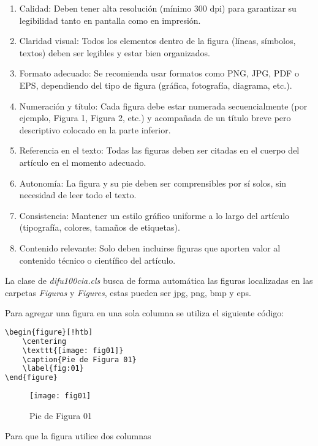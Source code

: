 \documentclass[12pt]{difu100cia} %
\begin{document}
\begin{enumerate}
    \item Calidad: Deben tener alta resolución (mínimo 300 dpi) para garantizar su legibilidad tanto en pantalla como en impresión.
    \item Claridad visual: Todos los elementos dentro de la figura (líneas, símbolos, textos) deben ser legibles y estar bien organizados.
    \item Formato adecuado: Se recomienda usar formatos como PNG, JPG, PDF o EPS, dependiendo del tipo de figura (gráfica, fotografía, diagrama, etc.).
    \item Numeración y título: Cada figura debe estar numerada secuencialmente (por ejemplo, Figura 1, Figura 2, etc.) y acompañada de un título breve pero descriptivo colocado en la parte inferior.
    \item Referencia en el texto: Todas las figuras deben ser citadas en el cuerpo del artículo en el momento adecuado.
    \item Autonomía: La figura y su pie deben ser comprensibles por sí solos, sin necesidad de leer todo el texto.
    \item Consistencia: Mantener un estilo gráfico uniforme a lo largo del artículo (tipografía, colores, tamaños de etiquetas).
    \item Contenido relevante: Solo deben incluirse figuras que aporten valor al contenido técnico o científico del artículo.
\end{enumerate}

La clase de \textit{difu100cia.cls} busca de forma automática las figuras localizadas en las carpetas \textit{Figuras} y \textit{Figures}, estas pueden ser jpg, png, bmp y eps.

Para agregar una figura en una sola columna se utiliza el siguiente código:

\begin{lstlisting}[language=bash]
\begin{figure}[!htb]
	\centering
	\texttt{[image: fig01]}
	\caption{Pie de Figura 01}
	\label{fig:01}
\end{figure}
\end{lstlisting}

\begin{figure}[!htb]
	\centering
	\texttt{[image: fig01]}
	\caption{Pie de Figura 01}
	\label{fig:01}
\end{figure}

Para que la figura utilice dos columnas 
\end{document}
